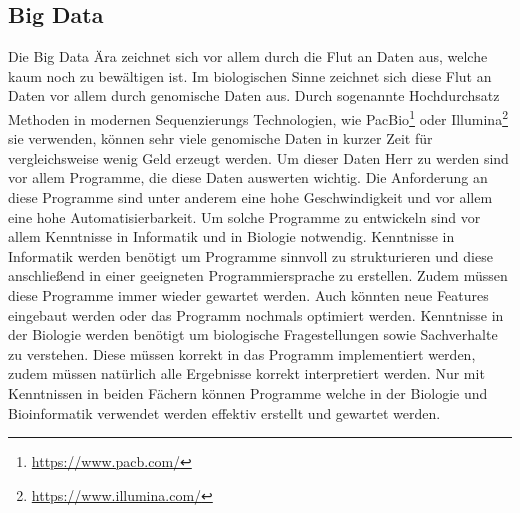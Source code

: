\documentclass{scrartcl}
\begin{document}
\subsection{Big Data}
\label{sec-2-2}
Die Big Data Ära zeichnet sich vor allem durch die Flut an Daten aus, welche kaum noch zu bewältigen ist. Im biologischen Sinne zeichnet sich diese 
Flut an Daten vor allem durch genomische Daten aus. Durch sogenannte Hochdurchsatz Methoden in modernen Sequenzierungs Technologien, wie PacBio\footnote{\url{https://www.pacb.com/}} oder Illumina\footnote{\url{https://www.illumina.com/}}
sie verwenden, können sehr viele genomische Daten in kurzer Zeit für vergleichsweise wenig Geld erzeugt werden. Um dieser Daten Herr zu werden sind vor allem
Programme, die diese Daten auswerten wichtig. Die Anforderung an diese Programme sind unter anderem eine hohe Geschwindigkeit und vor allem eine hohe 
Automatisierbarkeit. Um solche Programme zu entwickeln sind vor allem Kenntnisse in Informatik und in Biologie notwendig. Kenntnisse in Informatik
werden benötigt um Programme sinnvoll zu strukturieren und diese anschließend in einer geeigneten Programmiersprache zu erstellen. Zudem müssen diese
Programme immer wieder gewartet werden. Auch könnten neue Features eingebaut werden oder das Programm nochmals optimiert werden. Kenntnisse in der Biologie
werden benötigt um biologische Fragestellungen sowie Sachverhalte zu verstehen. Diese müssen korrekt in das Programm implementiert werden, zudem müssen 
natürlich alle Ergebnisse korrekt interpretiert werden. Nur mit Kenntnissen in beiden Fächern können Programme welche in der Biologie und Bioinformatik verwendet
werden effektiv erstellt und gewartet werden.  
\end{document}
